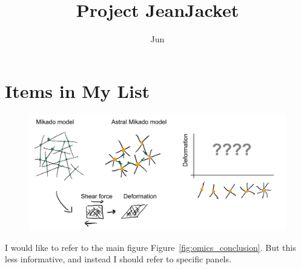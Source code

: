\documentclass[onecolumn,11pt]{article}
\title{Project JeanJacket}
\author[a]{Jun}
\affil[a]{University of California Irvine}
\date{} %
\begin{document}
\maketitle




\section*{Items in My List}
\processmylist







\clearpage


\begin{figure}[ht]
        \centering
        \includegraphics[width=4.5in]{figures/figJeanJacket.pdf}
        \begin{internalcaption}
        \end{internalcaption}
\end{figure}



I would like to refer to the main figure Figure~\ref{fig:omics_conclusion}. But this less informative, and instead I should refer to specific panels.
\end{document}
